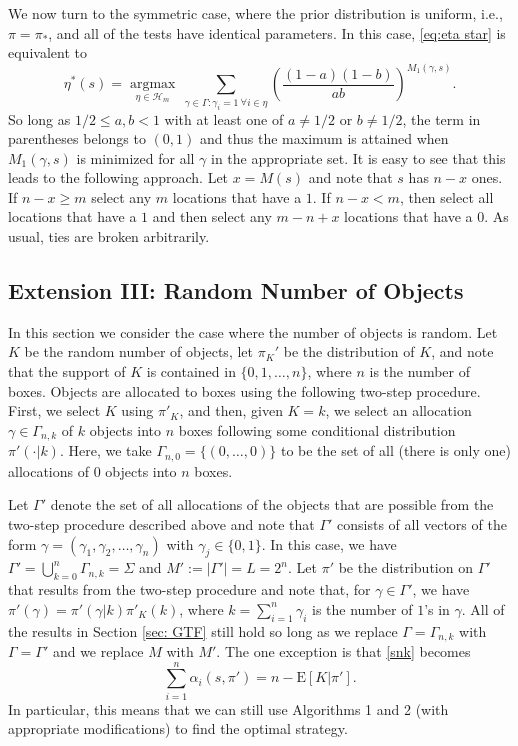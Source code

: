 \documentclass[a4paper,11pt]{article}
\begin{document}
We now turn to the symmetric case, where the prior distribution is uniform, i.e., $\pi=\pi_*$, and all of the tests have identical parameters.  In this case, \eqref{eq:eta star} is equivalent to
$$
\eta^*(s) = \underset{\eta\in\mathcal H_m}{\operatorname{argmax}}\  \sum\limits_{\gamma\in\Gamma: \gamma_i=1\ \forall i\in\eta} \left(\frac{(1-a)(1-b)}{ab}\right)^{M_1(\gamma,s)}.
$$
So long as $1/2\le a,b<1$ with at least one of $a\ne1/2$ or $b\ne1/2$, the term in parentheses belongs to $(0,1)$ and thus the maximum is attained when $M_1(\gamma,s)$ is minimized for all $\gamma$ in the appropriate set. It is easy to see that this leads to the following approach. Let $x=M(s)$ and note that $s$ has $n-x$ ones. If $n-x\ge m$ select any $m$ locations that have a $1$. If $n-x<m$, then select all locations that have a $1$ and then select any $m-n+x$ locations that have a $0$. As usual, ties are broken arbitrarily.

\subsection{Extension III: Random Number of Objects}\label{sec: gen variant rand k}

In this section we consider the case where the number of objects is random. Let $K$ be the random number of objects, let $\pi_K'$ be the distribution of $K$, and note that the support of $K$ is contained in $\{0,1,\dots,n\}$, where $n$ is the number of boxes. Objects are allocated to boxes using the following two-step procedure. First, we select $K$ using $\pi'_K$, and then, given $K=k$, we select an allocation $\gamma\in\Gamma_{n,k}$ of $k$ objects into $n$ boxes following some conditional distribution $\pi'(\cdot|k)$. Here, we take $\Gamma_{n,0}=\{(0,\dots,0)\}$ to be the set of all (there is only one) allocations of $0$ objects into $n$ boxes. 

Let $\Gamma'$ denote the set of all allocations of the objects that are possible from the two-step procedure described above and note that $\Gamma'$ consists of all vectors of the form $\gamma=(\gamma_{1},\gamma_{2},\dots,\gamma_{n})$ with $\gamma_j\in\{0,1\}$. In this case, we have $\Gamma'=\bigcup_{k=0}^n\Gamma_{n,k}=\Sigma$ and $M':=|\Gamma'|=L=2^n$. Let $\pi'$ be the distribution on $\Gamma'$ that results from the two-step procedure and note that, for $\gamma\in\Gamma'$, we have $\pi'(\gamma) = \pi'(\gamma|k)\pi'_K(k)$, where $k=\sum_{i=1}^n \gamma_i$ is the number of $1$'s in $\gamma$. All of the results in Section \ref{sec: GTF} still hold so long as we replace  $\Gamma = \Gamma_{n,k}$ with $\Gamma =\Gamma'$ and we replace $M$ with $M'$. The one exception is that \eqref{snk} becomes
$$
\sum_{i=1}^n\alpha_i(s,\pi') = n-\mathrm E[K|\pi'].
$$ 
In particular, this means that we can still use Algorithms 1 and 2 (with appropriate modifications) to find the optimal strategy.
\end{document}
